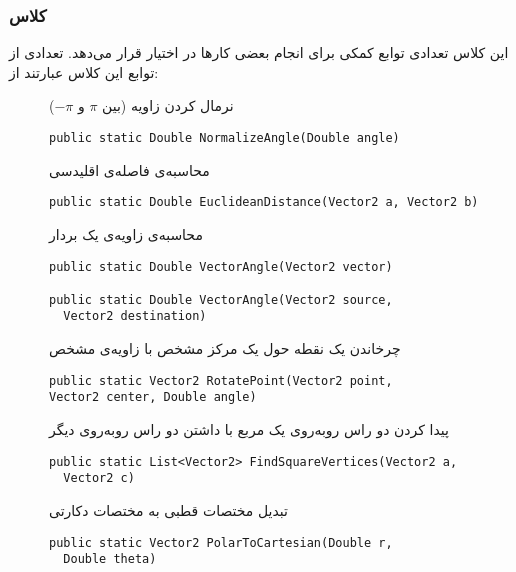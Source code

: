 \subsubsection{کلاس }
این کلاس تعدادی توابع کمکی برای انجام بعضی کارها در اختیار قرار می‌دهد. تعدادی از توابع این کلاس عبارتند از:
\begin{description}
  \item[]
  نرمال کردن زاویه (بین $\pi$ و $-\pi$)
\begin{latin}
{\linespread{1.2}
{\inconsolata
\lstset{language=Java}
\begin{lstlisting}
public static Double NormalizeAngle(Double angle)
\end{lstlisting}
}
}
\end{latin}
  \item[]
  محاسبه‌ی فاصله‌ی اقلیدسی
\begin{latin}
{\linespread{1.2}
{\inconsolata
\lstset{language=Java}
\begin{lstlisting}
public static Double EuclideanDistance(Vector2 a, Vector2 b)
\end{lstlisting}
}
}
\end{latin}
  \item[]
  محاسبه‌ی زاویه‌ی یک بردار
\begin{latin}
{\linespread{1.2}
{\inconsolata
\lstset{language=Java}
\begin{lstlisting}
public static Double VectorAngle(Vector2 vector)

public static Double VectorAngle(Vector2 source,
  Vector2 destination)
\end{lstlisting}
}
}
\end{latin}
  \item[]
  چرخاندن یک نقطه حول یک مرکز مشخص با زاویه‌ی مشخص
\begin{latin}
{\linespread{1.2}
{\inconsolata
\lstset{language=Java}
\begin{lstlisting}
public static Vector2 RotatePoint(Vector2 point,
Vector2 center, Double angle)
\end{lstlisting}
}
}
\end{latin}
  \item[]
  پیدا کردن دو راس رو‌به‌روی یک مربع با داشتن دو راس رو‌به‌روی دیگر
\begin{latin}
{\linespread{1.2}
{\inconsolata
\lstset{language=Java}
\begin{lstlisting}
public static List<Vector2> FindSquareVertices(Vector2 a,
  Vector2 c)
\end{lstlisting}
}
}
\end{latin}
  \item[]
  تبدیل مختصات قطبی به مختصات دکارتی
\begin{latin}
{\linespread{1.2}
{\inconsolata
\lstset{language=Java}
\begin{lstlisting}
public static Vector2 PolarToCartesian(Double r,
  Double theta)
\end{lstlisting}
}
}
\end{latin}
\end{description}

